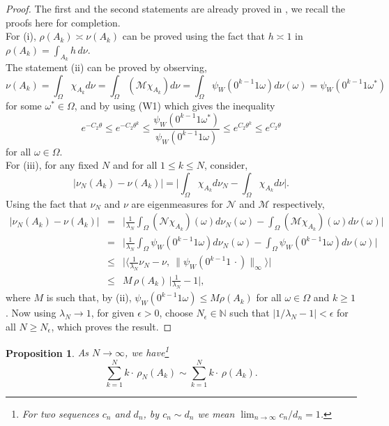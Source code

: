 \documentclass{amsart}
\newtheorem{proposition}[theorem]{Proposition}
\theoremstyle{definition}
\theoremstyle{remark}
\theoremstyle{definition}
\numberwithin{equation}{section}
\newcommand{\N}{\mathbb N}
\newcommand{\CM}{{\mathcal M}}
\newcommand{\CN}{{\mathcal N}}
\begin{document}
\begin{proof}
    The first and the second statements are already proved in \cite{Is}, we recall the proofs here for completion.\\
    For (i), $\rho(A_{k}) \asymp \nu(A_{k})$ can be proved using the fact that $h \asymp 1$ in $\rho(A_{k}) = \int_{A_{k}} h \, d\nu$. \\
    The statement (ii) can be proved by observing, 
    \[
    \nu(A_{k}) = \int_{\Omega} \chi_{A_{k}} d\nu =  \int_{\Omega} (\CM\chi_{A_{k}}) d\nu = \int_{\Omega} \psi_{W}(0^{k-1}1\omega) d\nu(\omega) = \psi_{W}(0^{k-1}1\omega^{*})
    \]
for some $\omega^{*} \in \Omega$, and by using (W1) which gives the inequality  
\[
e^{-C_{2} \theta}\le e^{-C_{2} \theta^k} \le \frac{\psi_{W}(0^{k-1}1\omega^{*})}{\psi_{W}(0^{k-1}1\omega)} \le e^{C_{2} \theta^k} \le e^{C_{2} \theta}
\] 
for all $\omega \in \Omega$.  \\
    For (iii), for any fixed $N$ and for all $1 \le k \le N$, consider,
    \[
        \big|\nu_{N}(A_{k}) - \nu(A_{k}) \big| = \big|\int_{\Omega} \chi_{A_{k}} d\nu_{N} - \int_{\Omega} \chi_{A_{k}} d\nu \big|.
    \] 
Using the fact that $\nu_{N}$ and $\nu$ are eigenmeasures for $\CN$ and $\CM$ respectively,
    \begin{eqnarray*}
         \big|\nu_{N}(A_{k}) - \nu(A_{k}) \big| & = & \Bigg| \frac{1}{\lambda_{N}} \int_{\Omega} (\CN \chi_{A_{k}}) (\omega) d\nu_{N}(\omega) - \int_{\Omega} (\CM \chi_{A_{k}}) (\omega) d\nu(\omega) \Bigg| \\
         & = & \Bigg| \frac{1}{\lambda_{N}} \int_{\Omega} \psi_{W}(0^{k-1}1\omega) d\nu_{N}(\omega) - \int_{\Omega} \psi_{W}(0^{k-1}1\omega) d\nu(\omega) \Bigg|\\
         & \le & \Bigg| \langle \frac{1}{\lambda_{N}}\nu_{N} - \nu, \  \| \psi_{W}(0^{k-1}1\, \cdot) \|_{\infty} \rangle  \Bigg|\\
         & \le & M \,\rho(A_{k}) \, \Big|\frac{1}{\lambda_{N}}-1\Big|,
    \end{eqnarray*}
    where $M$ is such that, by (ii), $\psi_{W}(0^{k-1}1\omega) \le M \rho(A_{k})$ for all $\omega \in \Omega$ and $k \ge 1$. Now using $\lambda_{N} \to 1$, for given $\epsilon>0$, choose $N_{\epsilon} \in \N$ such that $|1/\lambda_{N}-1| < \epsilon$ for all $N \ge N_{\epsilon}$, which proves the result.
\end{proof}

\begin{proposition} \label{prop-utile}
As $N\to \infty$, we have\footnote{For two sequences $c_{n}$ and $d_{n}$, by $c_{n} \sim d_{n}$ we mean $\lim_{n \to \infty} c_{n}/d_{n} = 1$.}
    \[ 
       \sum\limits_{k=1}^{N} k \cdot \, \rho_{N}(A_{k})  \sim \sum\limits_{k=1}^{N} k \cdot \, \rho(A_{k}). 
    \]
\end{proposition}
\end{document}
